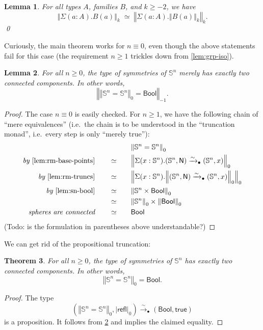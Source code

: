 \documentclass[11pt,a4paper,oneside,reqno]{amsart}
\newtheorem{theorem}{Theorem}
\newtheorem{lemma}[theorem]{Lemma}
\theoremstyle{definition}
\theoremstyle{remark}
\newcommand{\sph}[1]{{\mathbb S}^{#1}}
\newcommand{\refl}{\mathsf{refl}}
\newcommand{\trunc}[2]{\mathopen{}\left\Vert #2\right\Vert_{#1}\mathclose{}}
\newcommand{\tproj}[3][]{\mathopen{}\left|#3\right|_{#2}^{#1}\mathclose{}}
\newcommand{\North}{\mathsf N}
\begin{document}
\begin{lemma} \label{lem:rm-truncs}
 For all types $A$, families $B$, and $k \geq -2$, we have
 \begin{equation}
  \trunc k {\Sigma (a : A). B(a)} \; \simeq \; \trunc k {\Sigma (a : A). \trunc k {B(a)}}.
 \end{equation}
 \qed
\end{lemma}

Curiously, the main theorem works for $n \equiv 0$, even though the above statements fail for this case (the requirement $n \geq 1$ trickles down from \cref{lem:grp-iso}).
\begin{lemma} \label{lem:mainlemma}
 For all $n \geq 0$, the type of symmetries of $\sph n$ merely has exactly two connected components.
 In other words,
 \begin{equation}
  \trunc {-1} {\trunc 0 {\sph n = \sph n} = \mathsf{Bool}}.
 \end{equation}
\end{lemma}
\begin{proof}
 The case $n \equiv 0$ is easily checked.
 For $n \geq 1$, we have the following chain of ``mere equivalences'' (i.e.\ the chain is to be understood in the ``truncation monad'', i.e.\ every step is only ``merely true''):
  \begin{alignat}{5}
  &&&\trunc 0 {\sph n = \sph n} \\
  \textit{by }\cref{lem:rm-base-points} \qquad &\simeq &\quad& \trunc 0 {\Sigma(x : \sph n).(\sph n, \North) \xrightarrow{\sim}_\bullet (\sph n, x)}  \\
  \textit{by }\cref{lem:rm-truncs} \qquad &\simeq && \trunc 0 {\Sigma(x : \sph n).\trunc 0 {(\sph n, \North) \xrightarrow{\sim}_\bullet (\sph n, x)}}  \\
  \textit{by }\cref{lem:sn-bool} \qquad &\simeq && \trunc 0 {\sph n \times \mathsf{Bool}}  \\
  \textit{ } \qquad &\simeq && \trunc 0 {\sph n} \times \trunc 0 {\mathsf{Bool}}    \\
  \textit{spheres are connected} \qquad &\simeq && \mathsf{Bool}
 \end{alignat}
(Todo: is the formulation in parentheses above understandable?)
\end{proof}

We can get rid of the propositional truncation:
\begin{theorem} \label{thm:symmetries-two-components}
 For all $n \geq 0$, the type of symmetries of $\sph n$ has exactly two connected components.
 In other words,
 \begin{equation}
  \trunc 0 {\sph n = \sph n} = \mathsf{Bool}.
 \end{equation}
\end{theorem}
\begin{proof}
 The type 
 \begin{equation}
  \left(\trunc 0 {\sph n = \sph n}, \tproj {0} \refl\right) \xrightarrow{\sim}_\bullet (\mathsf{Bool},\mathsf{true})
 \end{equation}
 is a proposition.
 It follows from \cref{lem:mainlemma} and implies the claimed equality.
\end{proof}
\end{document}
